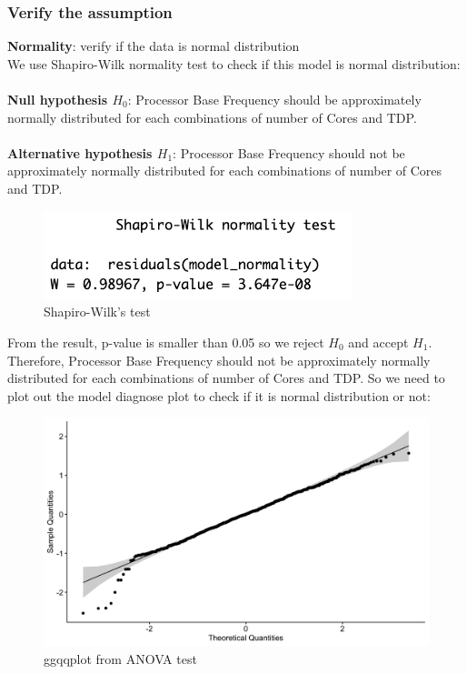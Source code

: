 \subsubsection{Verify the assumption}
\textbf{Normality}: verify if the data is normal distribution\\
We use Shapiro-Wilk normality test to check if this model is normal distribution:\\
\\
\textbf{Null hypothesis $H_0$}: Processor Base Frequency should be approximately normally distributed for each combinations of number of Cores and TDP.\\
\\
\textbf{Alternative hypothesis $H_1$}: Processor Base Frequency should not be approximately normally distributed for each combinations of number of Cores and TDP.
\begin{figure}[H]
    \centering
    \includegraphics[width=0.8\textwidth]{graphics/shapiro.png}
    \caption{Shapiro-Wilk's test}
    \label{fig:shapiro}
\end{figure}
From the result, p-value is smaller than 0.05 so we reject $H_0$ and accept $H_1$. Therefore, Processor Base Frequency should not be approximately normally distributed for each combinations of number of Cores and TDP. So we need to plot out the model diagnose plot to check if it is normal distribution or not:
\begin{figure}[H]
    \centering
    \includegraphics[width=1\textwidth]{graphics/check_normality.png}
    \caption{ggqqplot from ANOVA test}
    \label{fig:check_normality}
\end{figure}
